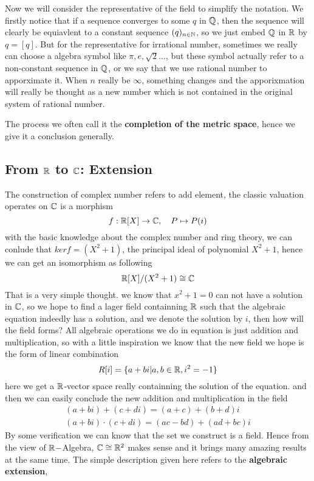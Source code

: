 \documentclass[en,geye,blue,normal,12pt]{elegantnote}
\begin{document}
Now we will consider the representative of the field to simplify the notation. We firstly notice that if a sequence converges to some \(q\) in \(\mathbb{Q} \), then the sequence will clearly be equiavlent to a constant sequence \((q)_{n \in \mathbb{N}}\), so we just embed \(\mathbb{Q}\) in \(\mathbb{R}\) by \(q = [q]\). But for the representative for irrational number, sometimes we really can choose a algebra symbol like \(\pi, e, \sqrt{2}\dots\), but these symbol actually refer to a non-constant sequence in \(\mathbb{Q}\), or we say that we use rational number to apporximate it. When \(n\) really be \(\infty\), something changes and the apporixmation will really be  thought as a new number which is not contained in the original system of rational number.

The process we often call it the \textbf{completion of the metric space}, hence we give it a conclusion generally.


\subsection{From \texorpdfstring{$\mathbb{R}$}{TEXT} to \texorpdfstring{$\mathbb{C}$}{TEXT}: Extension}

The construction of complex number refers to add element, the classic valuation operates on \(\mathbb{C}\) is a morphism\[f: \mathbb{R}[X] \to \mathbb{C}, \quad P \mapsto P(i)\]
with the basic knowledge about the complex number and ring theory, we can conlude that \(kerf = (X^2+1)\), the principal ideal of polynomial \(X^2+1\), hence we can get an isomorphism as following
\[\mathbb{R}[X] / (X^2+1) \cong  \mathbb{C} \]
That is a very simple thought. we know that \(x^2+1 = 0\) can not have a solution in \(\mathbb{C}\), so we hope to find a lager field containning \(\mathbb{R}\) such that the algebraic equation indeedly has a solution, and we denote the solution by \(i\), then how will the field forms? All algebraic operations we do in equation is just addition and multiplication, so with a little inspiration we know that the new field we hope is the form of linear combination
\[R[i] = \{a+bi | a,b \in \mathbb{R}, i^2 = -1\}\]
here we get a \(\mathbb{R}\)-vector space really containning the solution of the equation. and then we can easily conclude the new addition and multiplication in the field
\begin{align*}
  (a+bi) + (c+di) = (a+c)+(b+d)i \\
  (a+bi) \cdot (c+di) =  (ac-bd)+(ad+bc)i
\end{align*}
By some verification we can know that the set we construct is a field. Hence from the view of \(\mathbb{R}-\)Algebra, \(\mathbb{C} \cong \mathbb{R}^2\) makes sense and it brings many amazing results at the same time. The simple description given here refers to the \textbf{algebraic extension},
\end{document}
